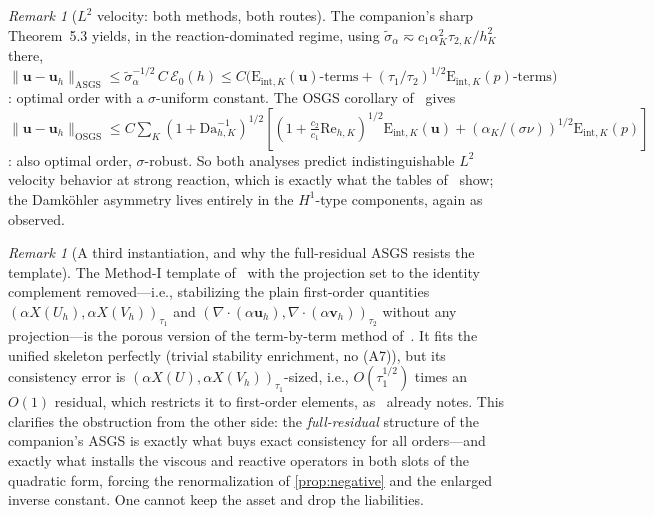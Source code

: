 \documentclass[11pt]{article}
\theoremstyle{remark}
\newtheorem{remark}[theorem]{Remark}
\newcommand{\bu}{\boldsymbol{u}}
\newcommand{\bv}{\boldsymbol{v}}
\newcommand{\norm}[1]{\lVert #1 \rVert}
\newcommand{\Eint}[2]{\mathrm{E}_{\mathrm{int},#1}(#2)}
\newcommand{\Dah}{\mathrm{Da}_{h,K}}
\newcommand{\Reh}{\mathrm{Re}_{h,K}}
\newcommand{\st}{\widetilde{\sigma}_\alpha}
\newcommand{\EF}{\mathcal{E}}
\begin{document}
\begin{remark}[$L^2$ velocity: both methods, both routes]
\label{rem:Ltwo}
The companion's sharp Theorem~5.3 yields, in the reaction-dominated regime, using
$\st \eqsim c_1\alpha_K^2\tau_{2,K}/h_K^2$ there,
$\norm{\bu-\bu_h}_{\mathrm{ASGS}} \le \st^{-1/2}\,C\,\EF_0(h) \le
C\bigl( \Eint{K}{\bu}\text{-terms} + (\tau_1/\tau_2)^{1/2}\Eint{K}{p}\text{-terms}
\bigr)$: optimal order with a $\sigma$-uniform constant. The OSGS corollary
of~\cite[Corollary~6.6]{OSGSnote} gives
$\norm{\bu-\bu_h}_{\mathrm{OSGS}} \le C\sum_K(1+\Dah^{-1})^{1/2}
[(1+\tfrac{c_2}{c_1}\Reh)^{1/2}\Eint{K}{\bu} +
(\alpha_K/(\sigma\nu))^{1/2}\Eint{K}{p}]$: also optimal order,
$\sigma$-robust. So both analyses predict indistinguishable $L^2$ velocity behavior
at strong reaction, which is exactly what the tables of~\cite{companion} show; the
Damk\"ohler asymmetry lives entirely in the $H^1$-type components, again as
observed.
\end{remark}

\begin{remark}[A third instantiation, and why the full-residual ASGS resists the
template]
\label{rem:thirdinstance}
The Method-I template of~\cite{Codina2008} with the projection set to the identity
complement removed---i.e., stabilizing the plain first-order quantities
$(\alpha X(U_h), \alpha X(V_h))_{\tau_1}$ and
$(\nabla\cdot(\alpha\bu_h), \nabla\cdot(\alpha\bv_h))_{\tau_2}$ without any
projection---is the porous version of the term-by-term method
of~\cite{Chacon1998}. It fits the unified skeleton perfectly (trivial stability
enrichment, no (A7)), but its consistency error is
$(\alpha X(U), \alpha X(V_h))_{\tau_1}$-sized, i.e., $O(\tau_1^{1/2})$ times an
$O(1)$ residual, which restricts it to first-order elements, as~\cite{Codina2008}
already notes. This clarifies the obstruction from the other side: the
\emph{full-residual} structure of the companion's ASGS is exactly what buys exact
consistency for all orders---and exactly what installs the viscous and reactive
operators in both slots of the quadratic form, forcing the renormalization of
\cref{prop:negative} and the enlarged inverse constant. One cannot keep the asset
and drop the liabilities.
\end{remark}
\end{document}
